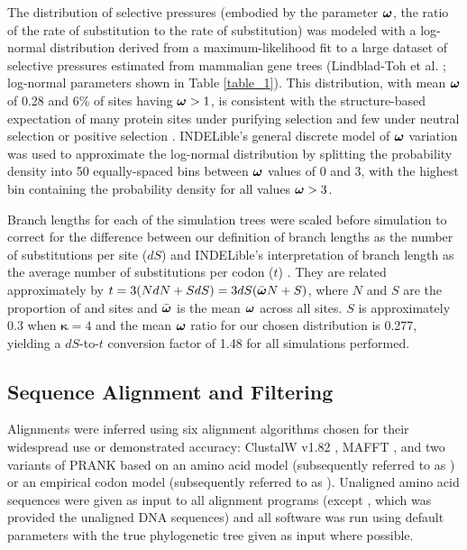 \documentclass{article}
\begin{document}
The distribution of \sw selective pressures (embodied by the parameter
$\bm{\omega}$, the ratio of the rate of \nsyn substitution to the
rate of \syn substitution) was modeled with a log-normal
distribution derived from a maximum-likelihood fit to a large dataset
of \sw selective pressures estimated from mammalian gene trees
(Lindblad-Toh et al. \citeyear{LindbladToh2011High}; log-normal parameters shown in Table
\ref{table_1}). This distribution, with mean $\bm{\omega}$ of 0.28 and 6\% of
sites having $\bm{\omega}>1$, is consistent with the structure-based
expectation of many protein sites under purifying selection and few
under neutral selection or positive selection
\citep{Smith1970Natural,Kimura1974SomePrinciples}. INDELible's general
discrete model of \sw $\bm{\omega}$ variation was used to approximate the
log-normal distribution by splitting the probability density into 50
equally-spaced bins between $\bm{\omega}$ values of 0 and 3, with the highest
bin containing the probability density for all values $\bm{\omega}>3$.

Branch lengths for each of the simulation trees were scaled before
simulation to correct for the difference between our definition of
branch lengths as the number of \syn substitutions per
\syn site ($dS$) and INDELible's interpretation of branch length
as the average number of substitutions per codon ($t$)
\citep{Fletcher2010Effect}. They are related approximately by
$t=3(NdN+SdS) = 3dS(\bar{\bm{\omega}{}}N+S)$, where $N$ and $S$ are the
proportion of \nsyn and \syn sites and $\bar{\bm{\omega}}$ is
the mean $\bm{\omega}$ across all sites. $S$ is approximately 0.3 when
$\bm{\kappa}=4$ \citep{Yang1998Synonymous} and the mean $\bm{\omega}$ ratio
for our chosen distribution is 0.277, yielding a $dS$-to-$t$
conversion factor of 1.48 for all simulations performed.

\subsection*{Sequence Alignment and Filtering}

Alignments were inferred using six alignment algorithms chosen for
their widespread use or demonstrated accuracy: ClustalW v1.82
\citep{Thompson1994ClustalW}, MAFFT \citep{Katoh2005MAFFT},  and two variants of
PRANK \citep{Loytynoja2008PhylogenyAware} based on an amino acid model
(subsequently referred to as \pranka{}) or an empirical codon model
(subsequently referred to as \prankc{}). Unaligned amino acid
sequences were given as input to all alignment programs (except
\prankc{}, which was provided the unaligned DNA sequences) and all
software was run using default parameters with the true phylogenetic
tree given as input where possible.
\end{document}
